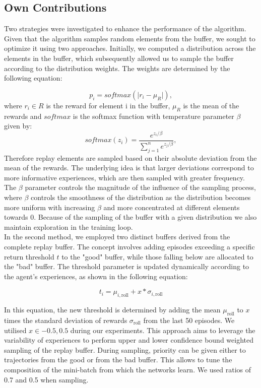 \documentclass{article}
\begin{document}
\subsection{Own Contributions}
Two strategies were investigated to enhance the performance of the algorithm. Given that the algorithm samples random elements from the buffer, we sought to optimize it using two approaches. Initially, we computed a distribution across the elements in the buffer, which subsequently allowed us to sample the buffer according to the distribution weights. The weights are determined by the following equation:

\begin{equation}
    p_i = softmax(\lvert r_i - \mu_R    \rvert),
\end{equation}
where $r_i \in R$ is the reward for element i in the buffer, $\mu_R$ is the mean of the rewards and $softmax$ is the softmax function with temperature parameter $\beta$ given by:
\begin{equation}
    softmax(z_i) = \frac{e^{z_i/\beta}}{\sum_{j=1}^ne^{z_j/\beta}},
\end{equation}
Therefore replay elements are sampled based on their absolute deviation from the mean of the rewards. The underlying idea is that larger deviations correspond to more informative experiences, which are then sampled with greater frequency. The $\beta$ parameter controls the magnitude of the influence of the sampling process, where $\beta$ controls the smoothness of the distribution as the distribution becomes more uniform with increasing $\beta$ and more concentrated at different elements towards 0. Because of the sampling of the buffer with a given distribution we also maintain exploration in the training loop.  \\

In the second method, we employed two distinct buffers derived from the complete replay buffer. The concept involves adding episodes exceeding a specific return threshold $t$ to the "good" buffer, while those falling below are allocated to the "bad" buffer. The threshold parameter is updated dynamically according to the agent's experiences, as shown in the following equation:

\begin{equation}
t_{i} = \mu_{i, \text{roll}} + x * \sigma_{i, \text{roll}}
\end{equation}

In this equation, the new threshold is determined by adding the mean $\mu_{\text{roll}}$ to $x$ times the standard deviation of rewards $\sigma_{\text{roll}}$ from the last 50 episodes. We utilised $x \in {-0.5, 0.5}$ during our experiments. This approach aims to leverage the variability of experiences to perform upper and lower confidence bound weighted sampling of the replay buffer. During sampling, priority can be given either to trajectories from the good or from the bad buffer. This allows to tune the composition of the mini-batch from which the networks learn. We used ratios of 0.7 and 0.5 when sampling.
\end{document}

